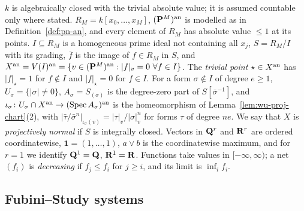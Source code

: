 \begin{convention}\label{conv:pg-setting}
\notready
{}
$k$ is algebraically closed with the trivial absolute value; it is assumed countable only where stated. $R_M=k[x_0,\dots,x_M]$,
$(\mathbf{P}^M)^{\mathrm{an}}$ is modelled as in Definition~\ref{def:pn-an}, and every element of $R_M$ has absolute value $\le1$ at its
points. $I\subseteq R_M$ is a homogeneous prime ideal not containing all $x_j$, $S=R_M/I$ with its grading,
$\bar f$ is the image of $f\in R_M$ in $S$, and $X^\an=V(I)^\an=\{v\in(\PP^M)^\an:|f|_v=0\ \forall f\in I\}$. The
\emph{trivial point} $\star\in X^{\mathrm{an}}$ has $|f|_\star=1$ for $f\notin I$ and $|f|_\star=0$ for $f\in I$. For a form
$\sigma\notin I$ of degree $e\ge1$, $U_\sigma=\{|\sigma|\ne0\}$, $A_\sigma=S_{(\sigma)}$ is the degree-zero part of
$S[\bar\sigma^{-1}]$, and $\iota_\sigma\colon U_\sigma\cap X^{\mathrm{an}}\to(\operatorname{Spec} A_\sigma)^{\mathrm{an}}$ is the homeomorphism of
Lemma~\ref{lem:wu-proj-chart}(2), with $|\bar\tau/\bar\sigma^n|_{\iota_\sigma(v)}=|\tau|_v/|\sigma|_v^n$ for forms $\tau$ of degree
$ne$. We say that $X$ is \emph{projectively normal} if $S$ is integrally closed. Vectors in $\mathbf{Q}^r$ and $\mathbf{R}^r$ are
ordered coordinatewise, $\mathbf 1=(1,\dots,1)$, $a\vee b$ is the coordinatewise maximum, and for $r=1$ we identify
$\mathbf{Q}^1=\mathbf{Q}$, $\mathbf{R}^1=\mathbf{R}$. Functions take values in $[-\infty,\infty)$; a net $(f_i)$ is \emph{decreasing} if $f_j\le f_i$
for $j\ge i$, and its limit is $\inf_if_i$.
\end{convention}

\subsection{Fubini--Study systems}\label{subsec:pg-fs-systems}


